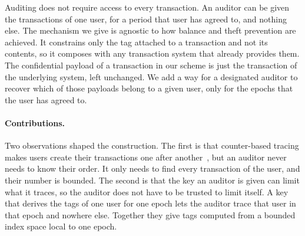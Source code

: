 Auditing does not require access to every transaction. An auditor can be given
the transactions of one user, for a period that user has agreed to, and nothing
else. The mechanism we give is agnostic to how balance and theft prevention are
achieved. It constrains only the tag attached to a transaction and not its
contents, so it composes with any transaction system that already provides
them. The confidential payload of a transaction in our scheme is just the
transaction of the underlying system, left unchanged. We add
a way for a designated auditor to recover which of those payloads belong to a
given user, only for the epochs that the user
has agreed to.


\paragraph{Contributions.} Two observations shaped the construction. The first
is that counter-based tracing makes users create their transactions one after
another~\cite{CCS:KiaKohSar22,CANS:SarKiaKoh24}, but an auditor never needs to
know their order. It only needs to find every transaction of the user, and their
number is bounded. The second is that the key an auditor is given can limit
what it traces, so the auditor does not have to be trusted to limit itself. A key that derives the tags of one user for one epoch lets the auditor
trace that user in that epoch and nowhere else. Together they give tags
computed from a bounded index space local to one epoch.

